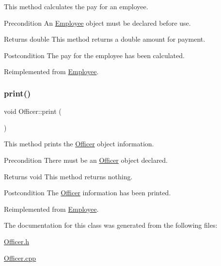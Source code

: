 This method calculates the pay for an employee.

\begin{DoxyPrecond}{Precondition}
An \hyperlink{classEmployee}{Employee} object must be declared before use. 
\end{DoxyPrecond}
\begin{DoxyReturn}{Returns}
double This method returns a double amount for payment. 
\end{DoxyReturn}
\begin{DoxyPostcond}{Postcondition}
The pay for the employee has been calculated. 
\end{DoxyPostcond}


Reimplemented from \hyperlink{classEmployee_a01c2c44e15434237db28832f6972e960}{Employee}.

\mbox{\label{classOfficer_aeadece05a1a0b7fb29bd412830d2e07a}} 
\subsubsection{\texorpdfstring{print()}{print()}}
{\footnotesize\ttfamily void Officer\+::print (\begin{DoxyParamCaption}{ }\end{DoxyParamCaption})\hspace{0.3cm}{\ttfamily [virtual]}}

This method prints the \hyperlink{classOfficer}{Officer} object information.

\begin{DoxyPrecond}{Precondition}
There must be an \hyperlink{classOfficer}{Officer} object declared. 
\end{DoxyPrecond}
\begin{DoxyReturn}{Returns}
void This method returns nothing. 
\end{DoxyReturn}
\begin{DoxyPostcond}{Postcondition}
The \hyperlink{classOfficer}{Officer} information has been printed. 
\end{DoxyPostcond}


Reimplemented from \hyperlink{classEmployee_a79556ad700627dba88049f487a34a762}{Employee}.



The documentation for this class was generated from the following files\+:\begin{DoxyCompactItemize}
\item 
\hyperlink{Officer_8h}{Officer.\+h}\item 
\hyperlink{Officer_8cpp}{Officer.\+cpp}\end{DoxyCompactItemize}
